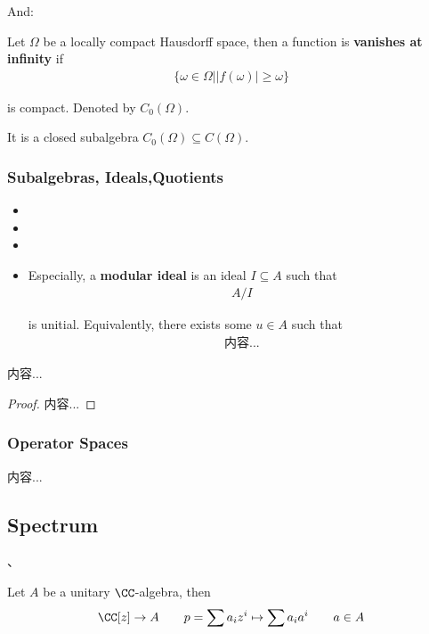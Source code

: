 \documentclass[Total.tex]{subfiles}
\begin{document}
		And:
		\begin{Def}
			Let $\Omega$ be a locally compact Hausdorff space, then a function is \textbf{vanishes at infinity} if
			\begin{gather*}
				\{\omega\in \Omega||f(\omega)|\geq \omega\}
			\end{gather*}
			
			is compact. Denoted by $C_0(\Omega)$. 
		\end{Def}
		
		It is a closed subalgebra $C_0(\Omega)\subseteq C(\Omega)$. 
		
		\subsubsection{Subalgebras, Ideals,Quotients}
			\begin{Def}
				\begin{itemize}
					\item 
					\item 
					\item 
					\item Especially, a \textbf{modular ideal} is an ideal $I\subseteq A$ such that
					\begin{gather*}
						A/I
					\end{gather*}
					
					is unitial. Equivalently, there exists some $u\in A$ such that
					\begin{gather*}
						内容...
					\end{gather*}
				\end{itemize}
			\end{Def}
			
			\begin{proposition}
				内容...
			\end{proposition}
			\begin{proof}
				内容...
			\end{proof}
			
		\subsubsection{Operator Spaces}
			\begin{Def}
				内容...
			\end{Def}
		\subsection{Spectrum}
			、\begin{Def} Let $A$ be a unitary $\CC$-algebra, then 
				\begin{gather*}
					\CC[z]\rightarrow A\qquad p=\sum a_i z^i\mapsto \sum a_i a^i\qquad a\in A
				\end{gather*}
			\end{Def}
			
\end{document}

